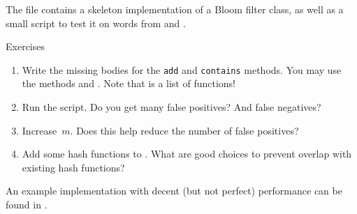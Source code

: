 \documentclass[12pt]{article}
\begin{document}
The file  contains a skeleton implementation of a Bloom filter class, as well as a small script to test it on words from  and .
%
\begin{mybox}{Exercises}
    \begin{enumerate}
        \item Write the missing bodies for the \texttt{add} and \texttt{contains} methods. You may use the methods  and . Note that  is a list of functions!
        \item Run the script. Do you get many false positives? And false negatives?
        \item Increase~$m$. Does this help reduce the number of false positives?
        \item Add some hash functions to . What are good choices to prevent overlap with existing hash functions?
    \end{enumerate}
\end{mybox}

An example implementation with decent (but not perfect) performance can be found in .
\end{document}
